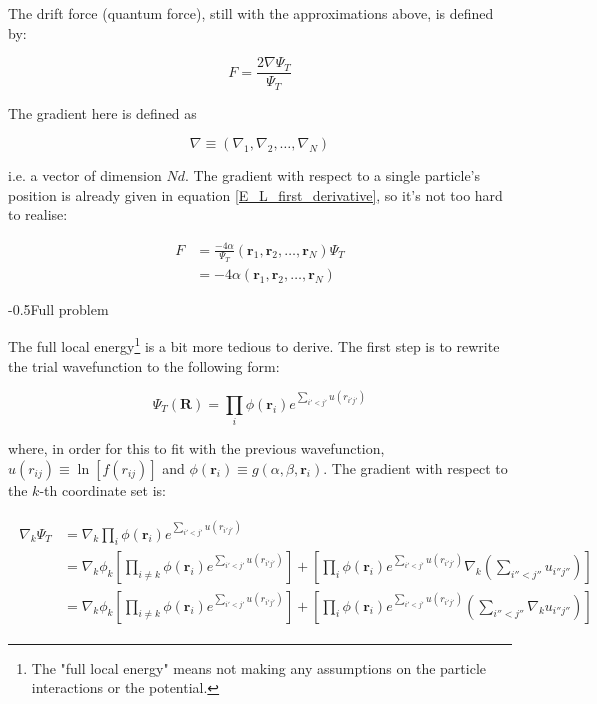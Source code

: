 \documentclass[english, a4paper]{article}
\makeatletter
\newcommand\lr[1]{\left(#1\right)}
\renewcommand{\subsubsection}{\@startsection{subsubsection}{3}{0pt}%
{-\baselineskip}{0.5\baselineskip}{\bf\large}}
\newcommand{\bm}[1]{\mathbf{#1}}
\makeatother
\begin{document}
The drift force (quantum force), still with the approximations above, is defined by:

\begin{equation}
	F = \frac{2\nabla\Psi_T}{\Psi_T}
\end{equation}

The gradient here is defined as

\begin{equation*}
	\nabla \equiv \lr{\nabla_1,\nabla_2,\ldots,\nabla_N}
\end{equation*}

i.e. a vector of dimension $Nd$. The gradient with respect to a single particle's position is already given in equation \ref{E_L_first_derivative}, so it's not too hard to realise:

\begin{align*}
	F &= \frac{-4\alpha}{\Psi_T}\lr{\bm{r}_1,\bm{r}_2,\ldots,\bm{r}_N}\Psi_T\\
	&= -4\alpha\lr{\bm{r}_1,\bm{r}_2,\ldots,\bm{r}_N}
\end{align*}


\subsubsection{Full problem}

The full local energy\footnote{The "full local energy" means not making any assumptions on the particle interactions or the potential.} is a bit more tedious to derive. The first step is to rewrite the trial wavefunction to the following form:

\begin{equation}
	\Psi_T(\bm{R}) = \prod_{i} \phi(\bm{r}_i)e^{\sum_{i'<j'}u(r_{i'j'})}
\end{equation}

where, in order for this to fit with the previous wavefunction, $u(r_{ij}) \equiv \ln[f(r_{ij})]$ and $\phi(\bm{r}_i) \equiv g(\alpha,\beta,\bm{r}_i)$. The gradient with respect to the $k$-th coordinate set is:

\begin{align}
	\begin{split}
	\nabla_k\Psi_T &= \nabla_k\prod_i \phi(\bm{r}_i)e^{\sum_{i'<j'}u(r_{i'j'})}\\
	&= \nabla_k\phi_k\left[\prod_{i\neq k} \phi(\bm{r}_i)e^{\sum_{i'<j'}u(r_{i'j'})}\right] + \left[\prod_i \phi(\bm{r}_i)e^{\sum_{i'<j'}u(r_{i'j'})}\nabla_k\left(\sum_{i''<j''}u_{i''j''} \right)\right]\\
	&= \nabla_k\phi_k\left[\prod_{i\neq k} \phi(\bm{r}_i)e^{\sum_{i'<j'}u(r_{i'j'})}\right] + \left[\prod_i \phi(\bm{r}_i)e^{\sum_{i'<j'}u(r_{i'j'})}\left(\sum_{i''<j''}\nabla_ku_{i''j''} \right)\right]
	\end{split}
\end{align}
\end{document}
